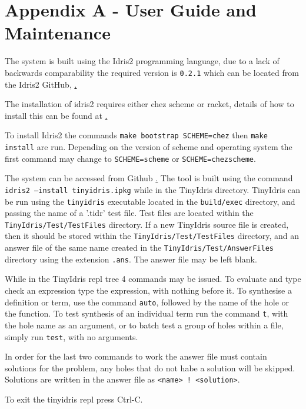 \documentclass[a4paper]{article}
\begin{document}
\nocite{*}
  
\clearpage

\section{Appendix A - User Guide and Maintenance}

The system is built using the Idris2 programming language, due to
a lack of backwards comparability the required version is
\texttt{0.2.1} which can be located from the Idris2 GitHub,
\href{https://github.com/idris-lang/Idris2/tree/compat-0.2.1}.

The installation of idris2 requires either chez scheme or racket,
details of how to install this can be found at
\href{https://www.scheme.com/}.

To install Idris2 the commands \texttt{make bootstrap SCHEME=chez}
then \texttt{make install} are run. Depending on the version of
scheme and operating system the first command may change to
\texttt{SCHEME=scheme} or \texttt{SCHEME=chezscheme}. 


The system can be accessed from Github \href{https://github.com/Ablach/tiny-idris-program-synthesis}. The tool is built using the command
\texttt{idris2 --install tinyidris.ipkg} while in the TinyIdris
directory. TinyIdris can be run using the \texttt{tinyidris}
executable located in the \texttt{build/exec} directory, and passing
the name of a '.tidr' test file. Test files are located within the \texttt{TinyIdris/Test/TestFiles} directory. If a new TinyIdris source file is created, then it
should be stored within the \texttt{TinyIdris/Test/TestFiles}
directory, and an answer file of the same name created in the
\texttt{TinyIdris/Test/AnswerFiles} directory using the extension \texttt{.ans}.
The answer file may be left blank. 

While in the TinyIdris repl tree 4 commands may be issued. To evaluate
and type check an expression type the expression, with nothing before
it. To synthesise a definition or term, use the command \texttt{auto},
followed by the name of the hole or the function.
To test synthesis of an individual term run the command \texttt{t},
with the hole name as an argument, or to batch test a group of holes
within a file, simply run \texttt{test}, with no arguments.

In order for the last two commands to work the answer file must contain
solutions for the problem, any holes that do not habe a solution will
be skipped. Solutions are written in the answer file as
\texttt{<name> ! <solution>}.

To exit the tinyidris repl press Ctrl-C.
\end{document}
